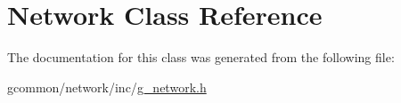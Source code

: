 \hypertarget{class_network}{\section{Network Class Reference}
\label{class_network}
}


The documentation for this class was generated from the following file\-:\begin{DoxyCompactItemize}
\item 
gcommon/network/inc/\hyperlink{g__network_8h}{g\-\_\-network.\-h}\end{DoxyCompactItemize}
